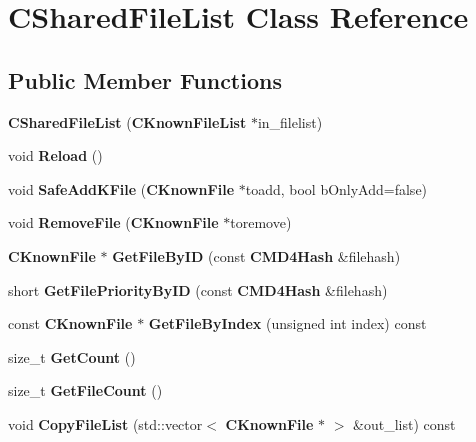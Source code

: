 \section{CSharedFileList Class Reference}
\label{classCSharedFileList}
\subsection*{Public Member Functions}
\begin{DoxyCompactItemize}
\item 
{\bfseries CSharedFileList} ({\bf CKnownFileList} $\ast$in\_\-filelist)\label{classCSharedFileList_a458c5503715fe42769f282423c7671a1}

\item 
void {\bfseries Reload} ()\label{classCSharedFileList_a2766473e92f5e6b253f77a233389c131}

\item 
void {\bfseries SafeAddKFile} ({\bf CKnownFile} $\ast$toadd, bool bOnlyAdd=false)\label{classCSharedFileList_a5741830d5c5a8ef53887ac30843a36d7}

\item 
void {\bfseries RemoveFile} ({\bf CKnownFile} $\ast$toremove)\label{classCSharedFileList_a125fac1128ded167a3f2a327da7a3578}

\item 
{\bf CKnownFile} $\ast$ {\bfseries GetFileByID} (const {\bf CMD4Hash} \&filehash)\label{classCSharedFileList_a14881266b0f6090869ad599d5ceb2530}

\item 
short {\bfseries GetFilePriorityByID} (const {\bf CMD4Hash} \&filehash)\label{classCSharedFileList_acad6d7bbcda22a9742d9a91a76b54785}

\item 
const {\bf CKnownFile} $\ast$ {\bfseries GetFileByIndex} (unsigned int index) const \label{classCSharedFileList_a3e313b810d2082e9dc6b779bbd6b3f9c}

\item 
size\_\-t {\bfseries GetCount} ()\label{classCSharedFileList_af10931ef8728d8ed28ef37c2abcc4f42}

\item 
size\_\-t {\bfseries GetFileCount} ()\label{classCSharedFileList_a5bece25eb385a89253421299b213eba4}

\item 
void {\bfseries CopyFileList} (std::vector$<$ {\bf CKnownFile} $\ast$ $>$ \&out\_\-list) const \label{classCSharedFileList_a37f58ae6939f60aed6ef81cfbf30ef14}


\end{DoxyCompactItemize}

